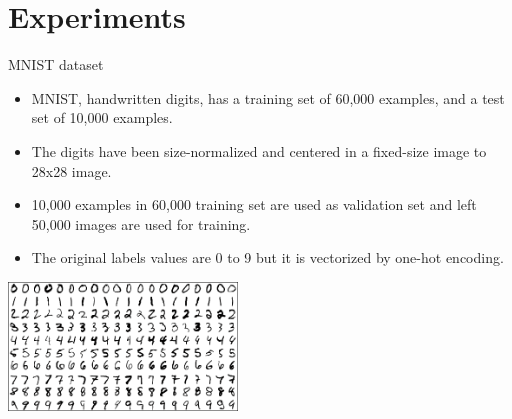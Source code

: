 \section{Experiments}
    \begin{frame}{MNIST dataset}
      \begin{itemize}
      \item {MNIST, handwritten digits, has a training set of 60,000 examples, and a test set of 10,000 examples.}
      \item {The digits have been size-normalized and centered in a fixed-size image to 28x28 image. }
      \item {10,000 examples in 60,000 training set are used as validation set and left 50,000 images are used for training.}
      \item {The original labels values are 0 to 9 but it is vectorized by one-hot encoding.}
      \end{itemize}
      \begin{center}
    \includegraphics[width=2.4in]{mnist.png}
      \end{center}
    \end{frame}
    
